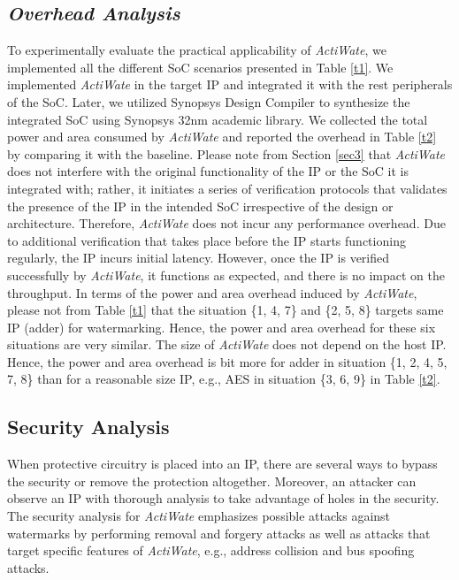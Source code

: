 \documentclass[onecolumn]{IEEEtran}
\begin{document}
\subsection{\textit{Overhead Analysis}}
\label{sec5a}
To experimentally evaluate the practical applicability of \textit{ActiWate},
we implemented all the different SoC scenarios presented in Table \ref{t1}.
We implemented \textit{ActiWate} in the target IP and integrated it with the
rest peripherals of the SoC. Later, we utilized Synopsys Design
Compiler to synthesize the integrated SoC using Synopsys
32nm academic library. We collected the total power and area
consumed by \textit{ActiWate} and reported the overhead in Table \ref{t2} by
comparing it with the baseline. Please note from Section \ref{sec3} that
\textit{ActiWate} does not interfere with the original functionality of the IP or
the SoC it is integrated with; rather, it initiates a series of verification
protocols that validates the presence of the IP in the intended SoC
irrespective of the design or architecture. Therefore, \textit{ActiWate} does
not incur any performance overhead. Due to additional verification  that takes place before the IP starts functioning regularly, the IP
incurs initial latency. However, once the IP is verified successfully
by \textit{ActiWate}, it functions as expected, and there is no impact on the
throughput. In terms of the power and area overhead induced by
\textit{ActiWate}, please not from Table \ref{t1} that the situation \{1, 4, 7\} and \{2, 5, 8\} targets same IP (adder) for watermarking. Hence, the power
and area overhead for these six situations are very similar. The size
of \textit{ActiWate} does not depend on the host IP. Hence, the power and
area overhead is bit more for adder in situation \{1, 2, 4, 5, 7, 8\} than
for a reasonable size IP, e.g., AES in situation \{3, 6, 9\} in Table \ref{t2}.

\subsection{Security Analysis}
\label{sec5b}
When protective circuitry is placed into an IP, there are several
ways to bypass the security or remove the protection altogether.
Moreover, an attacker can observe an IP with thorough analysis
to take advantage of holes in the security. The security analysis
for \textit{ActiWate} emphasizes possible attacks against watermarks by
performing removal and forgery attacks as well as attacks that target
specific features of \textit{ActiWate}, e.g., address collision and bus spoofing
attacks.
\end{document}
